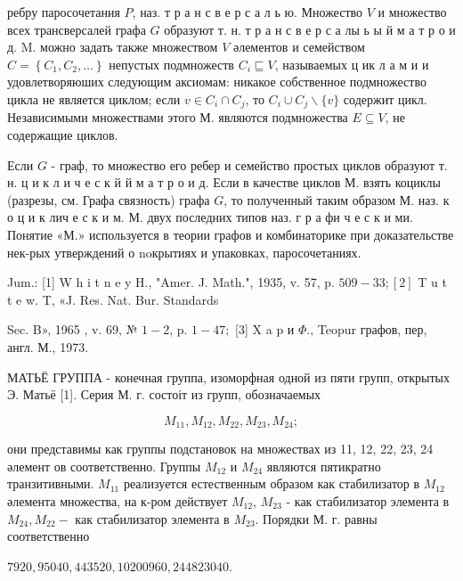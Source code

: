 \documentclass[10pt]{article}
\begin{document}
ребру паросочетания $P$, наз. т р а н с в е р с а л ь ю. Множество $V$ и множество всех трансверсалей графа $G$ образуют т. н. т р а н с в е р с а лы ь ы й м а т р о и д. M. можно задать также множеством $V$ әлементов и семейством $C=\left\{C_{1}, C_{2}, \ldots\right\}$ непустых подмножеств $C_{i} \sqsubseteq V$, называемых ц ик л а м и и удовлетворяюших следующим аксиомам: никакое собственное подмножество цикла не является циклом; если $v \in C_{i} \cap C_{j}$, то $C_{i} \cup C_{j} \backslash\{v\}$ содержит цикл. Независимыми множествами этого М. являются подмножества $E \subseteq V$, не содержащие циклов.



Если $G$ - граф, то множество его ребер и семейство простых циклов образуют т. н. ц и к л и ч е с к й й м а т р о и д. Если в качестве циклов М. взять коциклы (разрезы, см. Графа связность) графа $G$, то полученный таким образом М. наз. к о ц и к лич е с к и м. М. двух последних типов наз. г р а фи ч е с к и ми. Понятие «М.» используется в теории графов и комбинаторике при доказательстве нек-рых утверждений о noкрытиях и упаковках, паросочетаниях.



Jum.: [1] W h i t n e y H., "Amer. J. Math.", 1935, v. 57, p. $509-33 ;[2]$ T u t t e w. T, «J. Res. Nat. Bur. Standards

Sec. B», 1965 , v. 69, № $1-2$, p. $1-47 ;$ [3] X a p и $\Phi$., Teopur графов, пер, англ. М., 1973.



МАТЬЁ ГРУППА - конечная группа, изоморфная одной из пяти групп, открытых Э. Матьё [1]. Серия М. г. состоіт из групп, обозначаемых



\[

M_{11}, M_{12}, M_{22}, M_{23}, M_{24} ;

\]



они представимы как группы подстановок на множествах из 11, 12, 22, 23, 24 әлемент ов соответственно. Группы $M_{12}$ и $M_{24}$ являются пятикратно транзитивными. $M_{11}$ реализуется естественным образом как стабилизатор в $M_{12}$ әлемента множества, на к-ром действует $M_{12}$, $M_{23}$ - как стабилизатор элемента в $M_{24}, M_{22}-$ как стабилизатор элемента в $M_{23}$. Порядки М. г. равны соответственно



$7920,95040,443520,10200960,244823040$.
\end{document}

